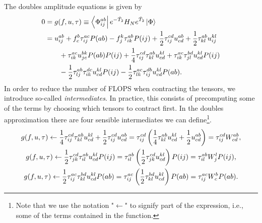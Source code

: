         The doubles amplitude equations is given by\cite{shavitt2009many}
        \begin{align}
            0 &= g(f, u, \tau)
            \equiv \bra{\Phi^{ab}_{ij}}e^{-\hat{T}_2}H_N e^{\hat{T}_2}\ket{\Phi}
            \\
            &=
            u^{ab}_{ij}
            + f^{b}_{c} \tau^{ac}_{ij} P(ab)
            - f^{k}_{j} \tau^{ab}_{ik} P(ij)
            + \frac{1}{2} \tau^{cd}_{ij} u^{ab}_{cd}
            + \frac{1}{2} \tau^{ab}_{kl} u^{kl}_{ij}
            \nonumber \\
            &\qquad
            + \tau^{ac}_{ik} u^{bk}_{jc} P(ab) P(ij)
            + \frac{1}{4} \tau^{cd}_{ij} \tau^{ab}_{kl} u^{kl}_{cd}
            + \tau^{ac}_{ik} \tau^{bd}_{jl} u^{kl}_{cd} P(ij)
            \nonumber \\
            &\qquad
            - \frac{1}{2} \tau^{ab}_{lj} \tau^{dc}_{ik} u^{kl}_{cd} P(ij)
            - \frac{1}{2} \tau^{ac}_{lk} \tau^{db}_{ij} u^{kl}_{cd} P(ab).
        \end{align}
        In order to reduce the number of FLOPS when contracting the tensors, we
        introduce so-called \emph{intermediates}\cite{hjorth2017advanced}. In
        practice, this consists of precomputing some of the terms by choosing
        which tensors to contract first. In the doubles approximation there are
        four sensible intermediates we can define\footnote{Note that we use the
        notation "$\gets$" to signify part of the expression, i.e., some of the
        terms contained in the function.}.
        \begin{gather}
            g(f, u, \tau)
            \gets
            \frac{1}{4} \tau^{cd}_{ij} \tau^{ab}_{kl} u^{kl}_{cd}
            + \frac{1}{2} \tau^{cd}_{ij} u^{ab}_{cd}
            =
            \tau^{cd}_{ij}\left( 
                \frac{1}{4} \tau^{ab}_{kl} u^{kl}_{cd}
                + \frac{1}{2} u^{ab}_{cd}
             \right)
            = \tau^{cd}_{ij}W^{ab}_{cd},
            \\
            g(f, u, \tau)
            \gets
            \frac{1}{2} \tau^{cd}_{jk} \tau^{ab}_{il} u^{kl}_{cd} P(ij)
            = \tau^{ab}_{il}\left( 
                \frac{1}{2} \tau^{cd}_{jk} u^{kl}_{cd}
             \right) P(ij)
            = \tau^{ab}_{il} W^{l}_{j} P(ij),
            \\
            g(f, u, \tau)
            \gets
            \frac{1}{2} \tau^{ac}_{ij} \tau^{bd}_{kl} u^{kl}_{cd} P(ab)
            = \tau^{ac}_{ij}\left( 
                \frac{1}{2} \tau^{bd}_{kl} u^{kl}_{cd}
             \right) P(ab)
            = \tau^{ac}_{ij} W^{b}_{c} P(ab).
        \end{gather}
